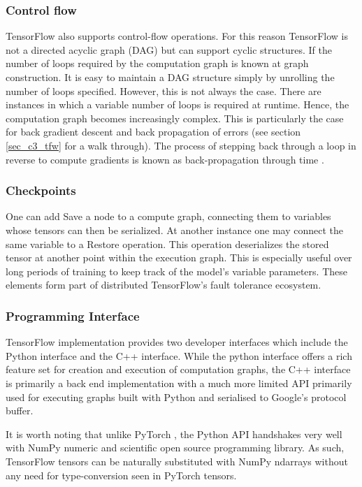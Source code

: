 \subsubsection{Control flow}
TensorFlow also supports control-flow operations.  For this reason TensorFlow is not a directed acyclic graph (DAG) but can support cyclic structures. If the number of loops required by the computation graph is known at graph construction.  It is easy to maintain a DAG structure simply by unrolling the number of loops specified.  However, this is not always the case.  There are instances in which a variable number of loops is required at runtime.  Hence, the computation graph becomes increasingly complex.  This is particularly the case for back gradient descent and back propagation of errors (see section \ref{sec_c3_tfw} for a  walk through).  The process of stepping back through a loop in reverse to compute gradients is known as back-propagation through time \citep{al2016theano}.

\subsubsection{Checkpoints}
One can add Save a node to a compute graph, connecting them to variables whose tensors can then be serialized. At another instance one may connect the same variable to a Restore operation. This operation deserializes the stored tensor at another point within the execution graph. This is especially useful over long periods of training to keep track of the model’s variable parameters. These elements form part of distributed TensorFlow's fault tolerance ecosystem.

\subsubsection{Programming Interface}
TensorFlow implementation provides two developer interfaces which include the Python interface and the C++ interface.  While the python interface offers a rich feature set for creation and execution of computation graphs, the C++ interface is primarily a back end implementation with a much more limited API primarily used for executing graphs built with Python and serialised to Google’s protocol buffer.

It is worth noting that unlike PyTorch \citep{ketkar2017introduction}, the Python API handshakes very well with NumPy\citep{numpy} numeric and scientific open source programming library. As such, TensorFlow tensors can be naturally substituted with NumPy ndarrays without any need for type-conversion seen in PyTorch tensors.


